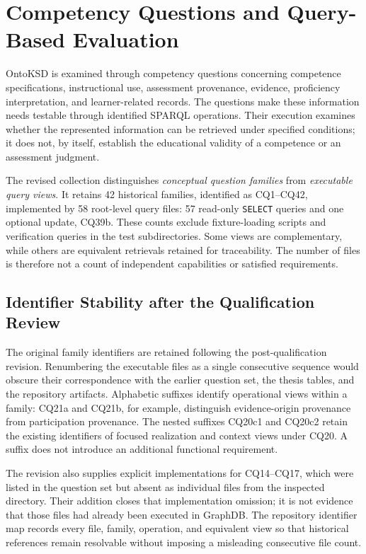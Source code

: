 \section{Competency Questions and Query-Based Evaluation}
\label{sec:ontoksd-competency-questions}

OntoKSD is examined through competency questions concerning competence
specifications, instructional use, assessment provenance, evidence,
proficiency interpretation, and learner-related records. The questions
make these information needs testable through identified SPARQL
operations. Their execution examines whether the represented information
can be retrieved under specified conditions; it does not, by itself,
establish the educational validity of a competence or an assessment
judgment.

The revised collection distinguishes \emph{conceptual question families}
from \emph{executable query views}. It retains 42 historical families,
identified as CQ1--CQ42, implemented by 58 root-level query files:
57 read-only \texttt{SELECT} queries and one optional update, CQ39b.
These counts exclude fixture-loading scripts and verification queries
in the test subdirectories. Some views are complementary, while others
are equivalent retrievals retained for traceability. The number of
files is therefore not a count of independent capabilities or satisfied
requirements.

\subsection{Identifier Stability after the Qualification Review}

The original family identifiers are retained following the
post-qualification revision. Renumbering the executable files as a
single consecutive sequence would obscure their correspondence with
the earlier question set, the thesis tables, and the repository
artifacts. Alphabetic suffixes identify operational views within a
family: CQ21a and CQ21b, for example, distinguish evidence-origin
provenance from participation provenance. The nested suffixes CQ20c1
and CQ20c2 retain the existing identifiers of focused realization and
context views under CQ20. A suffix does not introduce an additional
functional requirement.

The revision also supplies explicit implementations for CQ14--CQ17,
which were listed in the question set but absent as individual files
from the inspected directory. Their addition closes that implementation
omission; it is not evidence that those files had already been executed
in GraphDB. The repository identifier map records every file, family,
operation, and equivalent view so that historical references remain
resolvable without imposing a misleading consecutive file count.

